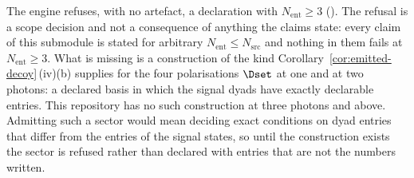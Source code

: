 
\begin{requirement}\label{req:entropy-cutoff}
The engine refuses, with no artefact, a declaration with
$N_{\mathrm{ent}}\ge3$ (). The refusal is a
scope decision and not a consequence of anything the claims state: every claim
of this submodule is stated for arbitrary $N_{\mathrm{ent}}\le N_{\mathrm{src}}$
and nothing in them fails at $N_{\mathrm{ent}}\ge3$. What is missing is a
construction of the kind Corollary~\ref{cor:emitted-decoy}\,(iv)(b) supplies
for the four polarisations $\Dset$ at one and at two photons: a declared
basis in which the signal dyads have exactly declarable entries. This
repository has no such construction at three photons and above. Admitting such
a sector would mean deciding exact conditions on dyad entries that differ from
the entries of the signal states, so until the construction exists the sector
is refused rather than declared with entries that are not the numbers written.
\end{requirement}
